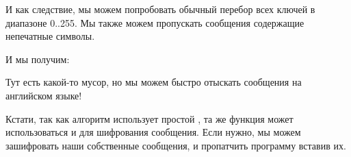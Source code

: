 И как следствие, мы можем попробовать обычный перебор всех ключей в диапазоне
 0..255.
Мы также можем пропускать сообщения содержащие непечатные символы.



И мы получим:



Тут есть какой-то мусор, но мы можем быстро отыскать сообщения на английском языке!

Кстати, так как алгоритм использует простой \XOR, та же функция может использоваться и для шифрования
сообщения.
Если нужно, мы можем зашифровать наши собственные сообщения, и пропатчить программу вставив
их.

